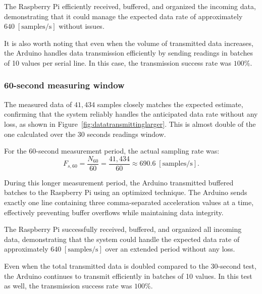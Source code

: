 {{		
		The Raspberry Pi efficiently received, buffered, and organized the incoming data, demonstrating that it could manage the expected data rate of approximately $640 \; [\text{samples/s}]$ without issues.
		
		It is also worth noting that even when the volume of transmitted data increases, the Arduino handles data transmission efficiently by sending readings in batches of 10 values per serial line. In this case, the transmission success rate was $100\%$.
	}
	
	\subsubsection{60-second measuring window}
	{
		The measured data of $41{,}434$ samples closely matches the expected estimate, confirming that the system reliably handles the anticipated data rate without any loss, as shown in Figure~\ref{fig:datatransmittinglarger}. This is almost double of the one calculated over the 30 seconds readings window.
		
		For the 60-second measurement period, the actual sampling rate was:
		\[
		F_{s,60} = \frac{N_{60}}{60} = \frac{41{,}434}{60} \approx 690.6 \; [\text{samples/s}].
		\]
		
		
		During this longer measurement period, the Arduino transmitted buffered batches to the Raspberry Pi using an optimized technique. The Arduino sends exactly one line containing three comma-separated acceleration values at a time, effectively preventing buffer overflows while maintaining data integrity.
		
		The Raspberry Pi successfully received, buffered, and organized all incoming data, demonstrating that the system could handle the expected data rate of approximately $640 \; [\text{samples/s}]$ over an extended period without any loss.
		
		Even when the total transmitted data is doubled compared to the 30-second test, the Arduino continues to transmit efficiently in batches of 10 values. In this test as well, the transmission success rate was $100\%$.
	}

	
}

